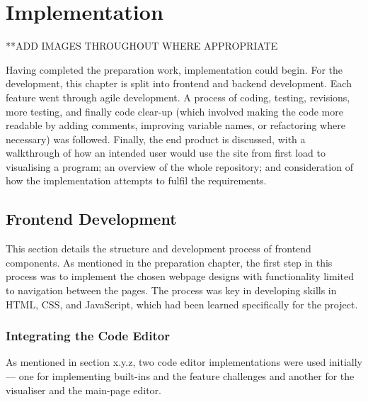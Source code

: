 \chapter{Implementation}
**ADD IMAGES THROUGHOUT WHERE APPROPRIATE

Having completed the preparation work, implementation could begin. For the development, this chapter is split into frontend and backend development. Each feature went through agile development. A process of coding, testing, revisions, more testing, and finally code clear-up (which involved making the code more readable by adding comments, improving variable names, or refactoring where necessary) was followed. Finally, the end product is discussed, with a walkthrough of how an intended user would use the site from first load to visualising a program; an overview of the whole repository; and consideration of how the implementation attempts to fulfil the requirements.

\section{Frontend Development}

This section details the structure and development process of frontend components. As mentioned in the preparation chapter, the first step in this process was to implement the chosen webpage designs with functionality limited to navigation between the pages. The process was key in developing skills in HTML, CSS, and JavaScript, which had been learned specifically for the project. 

\subsection{Integrating the Code Editor}

As mentioned in section x.y.z, two code editor implementations were used initially --- one for implementing built-ins and the feature challenges and another for the visualiser and the main-page editor.

